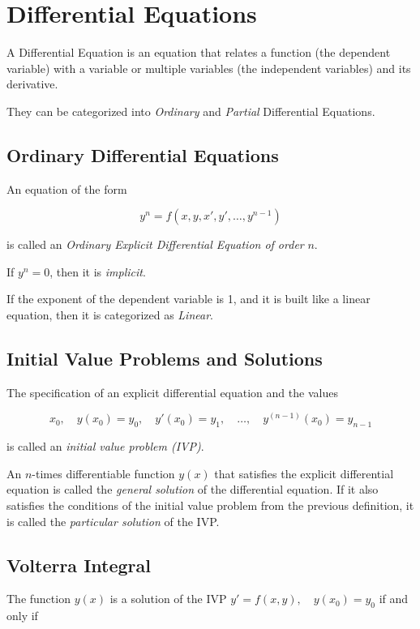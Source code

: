 \chapter{Differential Equations}

A Differential Equation is an equation that relates a function (the dependent variable) with a variable or multiple variables (the independent variables) 
and its derivative.

They can be categorized into \emph{Ordinary} and \emph{Partial} Differential Equations.

\section{Ordinary Differential Equations}

An equation of the form

\[
    y^n = f(x, y, x', y', \dots, y^{n -1})
\]

is called an \emph{Ordinary Explicit Differential Equation of order} \(n\).

If \(y^n = 0\), then it is \emph{implicit}.

If the exponent of the dependent variable is 1, and it is built like a linear equation, then it is categorized as \emph{Linear}.

\section{Initial Value Problems and Solutions}

The specification of an explicit differential equation and the values

\[
    x_0,\quad y(x_0) = y_0,\quad y'(x_0) = y_1,\quad \dots,\quad y^{(n-1)}(x_0) = y_{n-1}
\]

is called an \emph{initial value problem (IVP)}.

An \(n\)-times differentiable function \( y(x) \) that satisfies the explicit differential equation is called the \emph{general solution} of the
differential equation. If it also satisfies the conditions of the initial value problem from the previous definition, it is called the 
\emph{particular solution} of the IVP\@.

\section{Volterra Integral}

The function \(y(x)\) is a solution of the IVP \(y' = f(x,y),\quad y(x_0) = y_0\) if and only if

